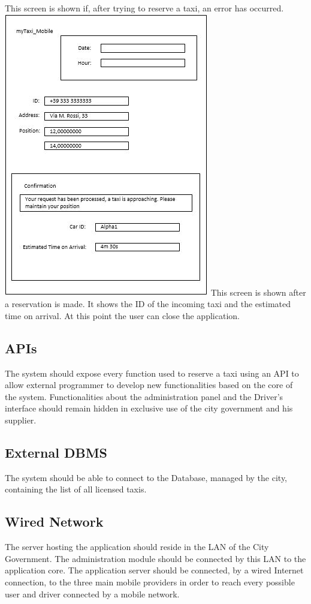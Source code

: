 \documentclass[12pt,a4paper]{book}
\begin{document}
				\hfill\break
				This screen is shown if, after trying to reserve a taxi, an error has occurred.
				\hfill\break
				\hfill\break	
				\includegraphics {mobile_page3}
				\hfill\break
				This screen is shown after a reservation is made. It shows the ID of the incoming taxi and the estimated time on arrival. At this point the user can close the application.
			\subsection{APIs}
			The system should expose every function used to reserve a taxi using an API to allow external programmer to develop new functionalities based on the core of the system. Functionalities about the administration panel and the Driver's interface should remain hidden in exclusive use of the city government and his supplier.
			\subsection{External DBMS}
			The system should be able to connect to the Database, managed by the city, containing the list of all licensed taxis.
			\subsection{Wired Network}
			The server hosting the application should reside in the LAN of the City Government. The administration module should be connected by this LAN to the application core.
			The application server should be connected, by a wired Internet connection, to the three main mobile providers in order to reach every possible user and driver connected by a mobile network.
\end{document}
